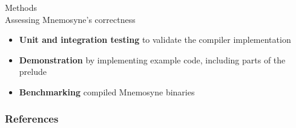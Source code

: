 \documentclass{beamer}
\begin{document}
\begin{frame}
\alert{\huge{Methods}}\\
\large{Assessing Mnemosyne's correctness}\normalsize
\begin{itemize}
    \item \textbf{Unit and integration testing} to validate the compiler implementation
    \item \textbf{Demonstration} by implementing example code, including parts of the prelude
    \item \textbf{Benchmarking} compiled Mnemosyne binaries
\end{itemize}
\end{frame}

\begin{frame}[t,allowframebreaks]
    \frametitle{\huge{References}}
    \scriptsize
    \printbibliography
\end{frame}
\end{document}
